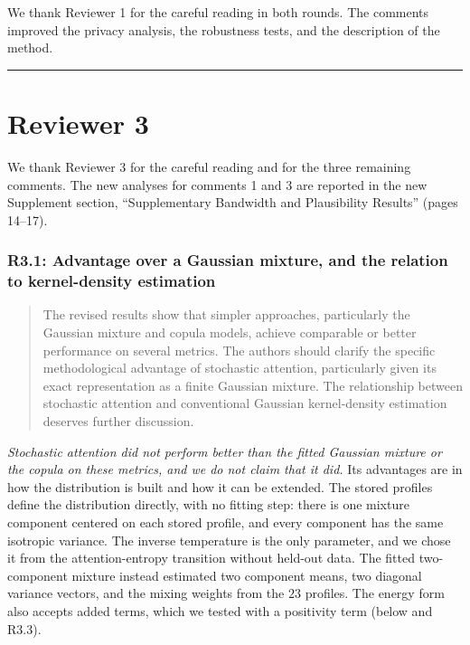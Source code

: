 \documentclass[
  11pt,
  letterpaper,
]{article}
\begin{document}
We thank Reviewer 1 for the careful reading in both rounds. The comments
improved the privacy analysis, the robustness tests, and the description
of the method.

\begin{center}\rule{0.5\linewidth}{0.5pt}\end{center}

\section{Reviewer 3}\label{reviewer-3}

We thank Reviewer 3 for the careful reading and for the three remaining
comments. The new analyses for comments 1 and 3 are reported in the new
Supplement section, ``Supplementary Bandwidth and Plausibility Results''
(pages 14--17).

\subsubsection{R3.1: Advantage over a Gaussian mixture, and the relation
to kernel-density
estimation}\label{r3.1-advantage-over-a-gaussian-mixture-and-the-relation-to-kernel-density-estimation}

\begin{quote}
The revised results show that simpler approaches, particularly the
Gaussian mixture and copula models, achieve comparable or better
performance on several metrics. The authors should clarify the specific
methodological advantage of stochastic attention, particularly given its
exact representation as a finite Gaussian mixture. The relationship
between stochastic attention and conventional Gaussian kernel-density
estimation deserves further discussion.
\end{quote}

\emph{Stochastic attention did not perform better than the fitted
Gaussian mixture or the copula on these metrics, and we do not claim
that it did.} Its advantages are in how the distribution is built and
how it can be extended. The stored profiles define the distribution
directly, with no fitting step: there is one mixture component centered
on each stored profile, and every component has the same isotropic
variance. The inverse temperature is the only parameter, and we chose it
from the attention-entropy transition without held-out data. The fitted
two-component mixture instead estimated two component means, two
diagonal variance vectors, and the mixing weights from the \(23\)
profiles. The energy form also accepts added terms, which we tested with
a positivity term (below and R3.3).
\end{document}
